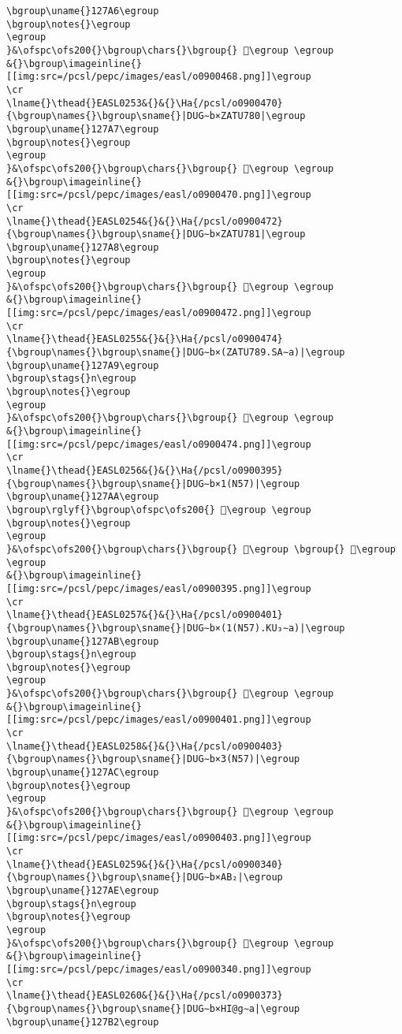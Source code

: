 \begin{verbatim}
\bgroup\uname{}127A6\egroup
\bgroup\notes{}\egroup
\egroup
}&\ofspc\ofs200{}\bgroup\chars{}\bgroup{} 𒞦\egroup \egroup
&{}\bgroup\imageinline{}[[img:src=/pcsl/pepc/images/easl/o0900468.png]]\egroup
\cr
\lname{}\thead{}EASL0253&{}&{}\Ha{/pcsl/o0900470}{\bgroup\names{}\bgroup\sname{}|DUG∼b×ZATU780|\egroup
\bgroup\uname{}127A7\egroup
\bgroup\notes{}\egroup
\egroup
}&\ofspc\ofs200{}\bgroup\chars{}\bgroup{} 𒞧\egroup \egroup
&{}\bgroup\imageinline{}[[img:src=/pcsl/pepc/images/easl/o0900470.png]]\egroup
\cr
\lname{}\thead{}EASL0254&{}&{}\Ha{/pcsl/o0900472}{\bgroup\names{}\bgroup\sname{}|DUG∼b×ZATU781|\egroup
\bgroup\uname{}127A8\egroup
\bgroup\notes{}\egroup
\egroup
}&\ofspc\ofs200{}\bgroup\chars{}\bgroup{} 𒞨\egroup \egroup
&{}\bgroup\imageinline{}[[img:src=/pcsl/pepc/images/easl/o0900472.png]]\egroup
\cr
\lname{}\thead{}EASL0255&{}&{}\Ha{/pcsl/o0900474}{\bgroup\names{}\bgroup\sname{}|DUG∼b×(ZATU789.SA∼a)|\egroup
\bgroup\uname{}127A9\egroup
\bgroup\stags{}n\egroup
\bgroup\notes{}\egroup
\egroup
}&\ofspc\ofs200{}\bgroup\chars{}\bgroup{} 𒞩\egroup \egroup
&{}\bgroup\imageinline{}[[img:src=/pcsl/pepc/images/easl/o0900474.png]]\egroup
\cr
\lname{}\thead{}EASL0256&{}&{}\Ha{/pcsl/o0900395}{\bgroup\names{}\bgroup\sname{}|DUG∼b×1(N57)|\egroup
\bgroup\uname{}127AA\egroup
\bgroup\rglyf{}\bgroup\ofspc\ofs200{} 𒞪\egroup \egroup
\bgroup\notes{}\egroup
\egroup
}&\ofspc\ofs200{}\bgroup\chars{}\bgroup{} 𒞸\egroup \bgroup{} 𒞪\egroup \egroup
&{}\bgroup\imageinline{}[[img:src=/pcsl/pepc/images/easl/o0900395.png]]\egroup
\cr
\lname{}\thead{}EASL0257&{}&{}\Ha{/pcsl/o0900401}{\bgroup\names{}\bgroup\sname{}|DUG∼b×(1(N57).KU₃∼a)|\egroup
\bgroup\uname{}127AB\egroup
\bgroup\stags{}n\egroup
\bgroup\notes{}\egroup
\egroup
}&\ofspc\ofs200{}\bgroup\chars{}\bgroup{} 𒞫\egroup \egroup
&{}\bgroup\imageinline{}[[img:src=/pcsl/pepc/images/easl/o0900401.png]]\egroup
\cr
\lname{}\thead{}EASL0258&{}&{}\Ha{/pcsl/o0900403}{\bgroup\names{}\bgroup\sname{}|DUG∼b×3(N57)|\egroup
\bgroup\uname{}127AC\egroup
\bgroup\notes{}\egroup
\egroup
}&\ofspc\ofs200{}\bgroup\chars{}\bgroup{} 𒞬\egroup \egroup
&{}\bgroup\imageinline{}[[img:src=/pcsl/pepc/images/easl/o0900403.png]]\egroup
\cr
\lname{}\thead{}EASL0259&{}&{}\Ha{/pcsl/o0900340}{\bgroup\names{}\bgroup\sname{}|DUG∼b×AB₂|\egroup
\bgroup\uname{}127AE\egroup
\bgroup\stags{}n\egroup
\bgroup\notes{}\egroup
\egroup
}&\ofspc\ofs200{}\bgroup\chars{}\bgroup{} 𒞮\egroup \egroup
&{}\bgroup\imageinline{}[[img:src=/pcsl/pepc/images/easl/o0900340.png]]\egroup
\cr
\lname{}\thead{}EASL0260&{}&{}\Ha{/pcsl/o0900373}{\bgroup\names{}\bgroup\sname{}|DUG∼b×HI@g∼a|\egroup
\bgroup\uname{}127B2\egroup

\end{verbatim}
